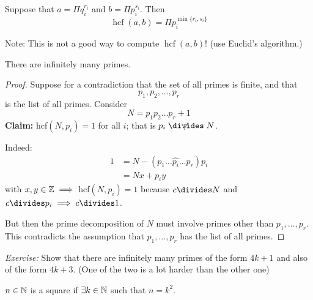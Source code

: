 \documentclass[10pt]{scrartcl}
\DeclareMathOperator{\hcf}{hcf}
\begin{document}
\begin{corollary}
Suppose that $a = \Pi q_i^{r_i}$ and $b = \Pi p_i^{s_i}$. Then 
\[\hcf(a,b) = \Pi p_i^{\min\{r_i,s_i\}}\]	
\end{corollary}

Note: This is not a good way to compute $\hcf(a,b)$! (use Euclid's algorithm.)\\


\begin{theorem}[Euclid]
There are infinitely many primes.
\end{theorem}

\begin{proof}
Suppose for a contradiction that the set of all primes is finite, and that
\[p_1,p_2,\dots,p_r\]	
is the list of all primes. Consider 
\[N = p_1p_2\dots p_r + 1\]
\textbf{Claim:} hcf$(N,p_i) =1$ for all $i$; that is $p_i \centernot\divides N$.

Indeed:
\[
\begin{aligned}
  1 &= N - (p_1\dots \hat{p_i}\dots p_r)p_i\\
  &= Nx + p_iy
\end{aligned}
\]
with $x,y \in\mathbb{Z} \implies $ hcf$(N,p_i) = 1$ because $c \divides N$ and $c \divides p_i \implies c \divides 1$. 

But then the prime decomposition of $N$ must involve primes other than $p_1,\dots,p_r$. This contradicts the assumption that $p_1,\dots,p_r$ has the list of all primes.
\end{proof}

\emph{Exercise:} Show that there are infinitely many primes of the form $4k+1$ and also of the form $4k+3$. (One of the two is a lot harder than the other one) \\

\vspace*{5pt}

\begin{definition}  
$n \in\mathbb{N}$ is a square if $\exists k \in\mathbb{N}$ such that $n = k^2$.	
\end{definition}\vspace*{5pt}
\end{document}
